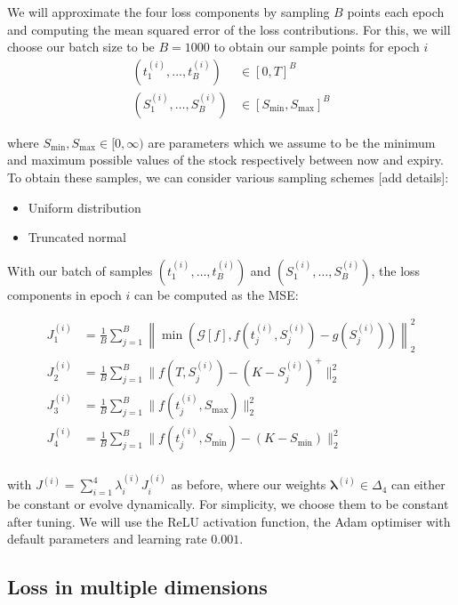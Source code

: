 We will approximate the four loss components by sampling $B$ points each epoch and computing the mean squared error of the loss contributions. For this, we will choose our batch size to be $B=1000$ to obtain our sample points for epoch $i$
\begin{align*}
    (t_1^{(i)}, \dots, t_B^{(i)}) &\in [0, T]^B\\
    (S_1^{(i)}, \dots, S_B^{(i)}) &\in [S_\text{min}, S_\text{max}]^B
\end{align*}

where $S_\text{min}, S_\text{max} \in [0, \infty)$ are parameters which we assume to be the minimum and maximum possible values of the stock respectively between now and expiry. To obtain these samples, we can consider various sampling schemes [add details]:

\begin{itemize}
    \item Uniform distribution
    \item Truncated normal
\end{itemize}

With our batch of samples $(t_1^{(i)}, \dots, t_B^{(i)})$ and $(S_1^{(i)}, \dots, S_B^{(i)})$, the loss components in epoch $i$ can be computed as the MSE:

\begin{align*}
J_1^{(i)} &= \frac 1B\sum_{j=1}^B\left\|
\min\left(\mathcal G[f], f(t_j^{(i)}, S_j^{(i)}) - g(S_j^{(i)})\right)
\right\|^2_2 \\
J_2^{(i)} &= \frac 1B\sum_{j=1}^B \| f(T, S_j^{(i)}) - (K-S_j^{(i)})^+\|^2_2\\
J_3^{(i)} &= \frac 1B\sum_{j=1}^B \|f(t_j^{(i)}, S_\text{max}) \|^2_2\\
J_4^{(i)} &= \frac 1B\sum_{j=1}^B \| f(t_j^{(i)}, S_\text{min}) - (K-S_\text{min})\|^2_2\\
\end{align*}

with $J^{(i)} = \sum_{i=1}^4 \lambda_i^{(i)} J_i^{(i)}$ as before, where our weights $\bm \lambda^{(i)} \in \Delta_4$ can either be constant or evolve dynamically. For simplicity, we choose them to be constant after tuning. We will use the ReLU activation function, the Adam optimiser with default parameters and learning rate $0.001$.

\subsection{Loss in multiple dimensions}

